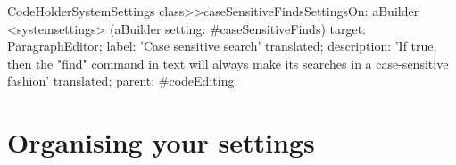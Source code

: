 \documentclass[a4paper,10pt,twoside]{book}
\begin{document}
\begin{code}{}
CodeHolderSystemSettings class>>caseSensitiveFindsSettingsOn: aBuilder
	<systemsettings>
	(aBuilder setting: #caseSensitiveFinds) 
		target: ParagraphEditor;
		label: 'Case sensitive search' translated;
		description: 'If true, then the "find" command in text will always make its searches in a case-sensitive fashion' translated;
		parent: #codeEditing.
\end{code}


\section{Organising your settings}
\label{sec:OrganisingYourSettings}

\end{document}

